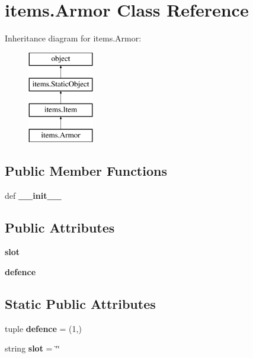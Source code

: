 \hypertarget{classitems_1_1_armor}{}\section{items.\+Armor Class Reference}
\label{classitems_1_1_armor}
Inheritance diagram for items.\+Armor\+:\begin{figure}[H]
\begin{center}
\leavevmode
\includegraphics[height=4.000000cm]{classitems_1_1_armor}
\end{center}
\end{figure}
\subsection*{Public Member Functions}
\begin{DoxyCompactItemize}
\item 
\hypertarget{classitems_1_1_armor_ad18896cf603da9814951b3f60d725622}{}def {\bfseries \+\_\+\+\_\+init\+\_\+\+\_\+}\label{classitems_1_1_armor_ad18896cf603da9814951b3f60d725622}

\end{DoxyCompactItemize}
\subsection*{Public Attributes}
\begin{DoxyCompactItemize}
\item 
\hypertarget{classitems_1_1_armor_a9e657d008f23e31e8bbb95073108d9ee}{}{\bfseries slot}\label{classitems_1_1_armor_a9e657d008f23e31e8bbb95073108d9ee}

\item 
\hypertarget{classitems_1_1_armor_a7cbb8ddcc295c0508f3a60d28cd655e6}{}{\bfseries defence}\label{classitems_1_1_armor_a7cbb8ddcc295c0508f3a60d28cd655e6}

\end{DoxyCompactItemize}
\subsection*{Static Public Attributes}
\begin{DoxyCompactItemize}
\item 
\hypertarget{classitems_1_1_armor_a013f9190caa68108ab4678e055a75845}{}tuple {\bfseries defence} = (1,)\label{classitems_1_1_armor_a013f9190caa68108ab4678e055a75845}

\item 
\hypertarget{classitems_1_1_armor_a95b8cd1da1fda45c5584923b1298bfd7}{}string {\bfseries slot} = \char`\"{}\char`\"{}\label{classitems_1_1_armor_a95b8cd1da1fda45c5584923b1298bfd7}

\end{DoxyCompactItemize}


